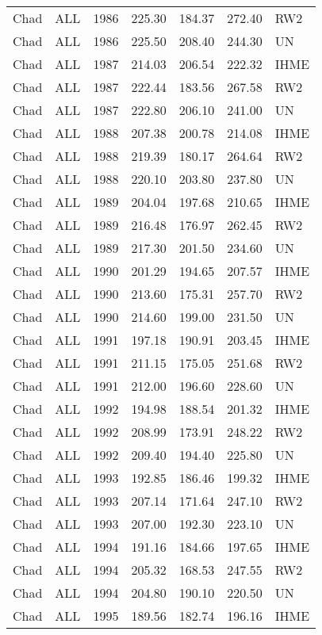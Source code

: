 \begin{longtable}{lllrrrl}
  Chad & ALL & 1986 & 225.30 & 184.37 & 272.40 & RW2 \\ 
  Chad & ALL & 1986 & 225.50 & 208.40 & 244.30 & UN \\ 
  Chad & ALL & 1987 & 214.03 & 206.54 & 222.32 & IHME \\ 
  Chad & ALL & 1987 & 222.44 & 183.56 & 267.58 & RW2 \\ 
  Chad & ALL & 1987 & 222.80 & 206.10 & 241.00 & UN \\ 
  Chad & ALL & 1988 & 207.38 & 200.78 & 214.08 & IHME \\ 
  Chad & ALL & 1988 & 219.39 & 180.17 & 264.64 & RW2 \\ 
  Chad & ALL & 1988 & 220.10 & 203.80 & 237.80 & UN \\ 
  Chad & ALL & 1989 & 204.04 & 197.68 & 210.65 & IHME \\ 
  Chad & ALL & 1989 & 216.48 & 176.97 & 262.45 & RW2 \\ 
  Chad & ALL & 1989 & 217.30 & 201.50 & 234.60 & UN \\ 
  Chad & ALL & 1990 & 201.29 & 194.65 & 207.57 & IHME \\ 
  Chad & ALL & 1990 & 213.60 & 175.31 & 257.70 & RW2 \\ 
  Chad & ALL & 1990 & 214.60 & 199.00 & 231.50 & UN \\ 
  Chad & ALL & 1991 & 197.18 & 190.91 & 203.45 & IHME \\ 
  Chad & ALL & 1991 & 211.15 & 175.05 & 251.68 & RW2 \\ 
  Chad & ALL & 1991 & 212.00 & 196.60 & 228.60 & UN \\ 
  Chad & ALL & 1992 & 194.98 & 188.54 & 201.32 & IHME \\ 
  Chad & ALL & 1992 & 208.99 & 173.91 & 248.22 & RW2 \\ 
  Chad & ALL & 1992 & 209.40 & 194.40 & 225.80 & UN \\ 
  Chad & ALL & 1993 & 192.85 & 186.46 & 199.32 & IHME \\ 
  Chad & ALL & 1993 & 207.14 & 171.64 & 247.10 & RW2 \\ 
  Chad & ALL & 1993 & 207.00 & 192.30 & 223.10 & UN \\ 
  Chad & ALL & 1994 & 191.16 & 184.66 & 197.65 & IHME \\ 
  Chad & ALL & 1994 & 205.32 & 168.53 & 247.55 & RW2 \\ 
  Chad & ALL & 1994 & 204.80 & 190.10 & 220.50 & UN \\ 
  Chad & ALL & 1995 & 189.56 & 182.74 & 196.16 & IHME \\ 

\end{longtable}
